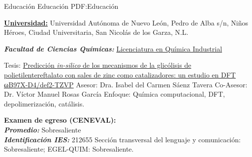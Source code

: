 \Section
	{Educación}
	{Educación}
	{PDF:Educación}


%




\Entry
	\href{https://www.uanl.mx}
	{\textbf{Universidad:}}
	\hfill
	\Gap
	Universidad Autónoma de Nuevo León, Pedro de Alba s/n, Niños Héroes, Ciudad Universitaria, San Nicolás de los Garza, N.L.

\Gap

\BulletItem
	\textbf{\textit{Facultad de Ciencias Químicas:}}
	\href{http://www.fcq.uanl.mx/}
	{Licenciatura en Química Industrial}
	\hfill
	\begin{Detail}
		\SubBulletItem
		Tesis:
		\href{https://www.icloud.com/iclouddrive/0cfgD6maOU4-X1y5lNikwk4eQ#PEAG-Tesis_final}
		{Predicción \textit{in-silico} de los mecanismos de la glicólisis de polietilentereftalato con sales de zinc como catalizadores: un estudio en DFT ωB97X-D4/def2-TZVP}
		\SubSubBulletItem
		Asesor:
		Dra. Isabel del Carmen Sáenz Tavera
		\SubSubBulletItem
		Co-Asesor:
		Dr. Víctor Manuel Rosas García
		\SubSubBulletItem
		Enfoque:
		Química computacional, DFT, depolimerización, catálisis.

    \Gap

		\SubBulletItem
		\textbf{Examen de egreso (CENEVAL):}\\
		\textit{\textbf{Promedio:}} Sobresaliente\\
		\textit{\textbf{Identificación IES:}} 212655
		\SubSubBulletItem Sección transversal del lenguaje y comunicación: Sobresaliente;
		\SubSubBulletItem EGEL-QUIM: Sobresaliente.
	\end{Detail}

